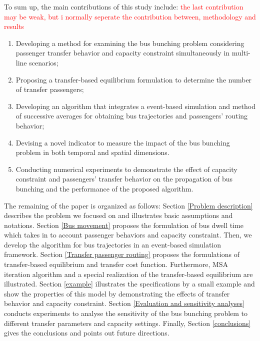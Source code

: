 \documentclass[smallextended]{svjour3}       %
\begin{document}
\begin{Abstract}
To sum up, the main contributions of this study include:
\textcolor{red}{the last contribution may be weak, but i normally seperate the contribution between, methodology and results}
\begin{enumerate}
    \item Developing a method for examining the bus bunching problem considering passenger transfer behavior and capacity constraint simultaneously in multi-line scenarios;
    \item Proposing a transfer-based equilibrium formulation to determine the number of transfer passengers;
    \item Developing an algorithm that integrates a event-based simulation and method of successive averages 
     for obtaining bus trajectories and passengers' routing behavior;
    \item Devising a novel indicator to measure the impact of the bus bunching problem in both temporal and spatial dimensions.
    \item Conducting numerical experiments to demonstrate the effect of capacity constraint and passengers' transfer behavior on the propagation of bus bunching and the performance of the proposed algorithm.
\end{enumerate}

The remaining of the paper is organized as follows: 
Section \ref{Problem description} describes the problem we focused on and illustrates basic assumptions and notations. 
Section \ref{Bus movement} proposes the formulation of bus dwell time which takes in to account passenger behaviors and capacity constraint.
Then, we develop the algorithm for bus trajectories in an event-based simulation framework. 
Section \ref{Transfer passenger routing} proposes the formulations of transfer-based equilibrium and transfer cost function.
Furthermore, MSA iteration algorithm and a special realization of the transfer-based equilibrium are illustrated.
Section \ref{example} illustrates the specifications by a small example 
and show the properties of this model 
by demonstrating the effects of transfer behavior and capacity constraint.
Section \ref{Evaluation and sensitivity analyses} conducts experiments to analyse the sensitivity of the bus bunching problem 
to different transfer parameters and capacity settings. 
Finally, Section \ref{conclusions} gives the conclusions and points out future directions.



\end{Abstract}
\end{document}
